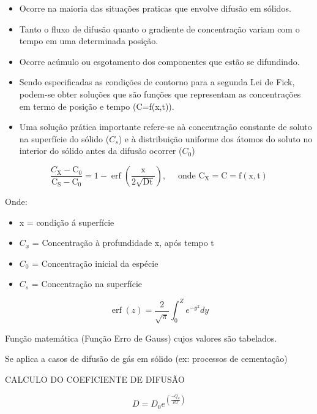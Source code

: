 \begin{itemize}
	\item Ocorre na maioria das situações praticas que envolve difusão em sólidos.
	\item Tanto o fluxo de difusão quanto o gradiente de concentração variam com o tempo em uma determinada posição.
	\item Ocorre acúmulo ou esgotamento dos componentes que estão se difundindo.
	\item Sendo especificadas as condições de contorno para a segunda Lei de Fick, podem-se obter soluções que são funções que representam as concentrações em termo de posição e tempo (C=f(x,t)).
	\item Uma solução prática importante refere-se aà concentração constante de soluto na superfície do sólido ($C_{s}$) e à distribuição uniforme dos átomos do soluto no interior do sólido antes da difusão  ocorrer ($C_{0}$)
\end{itemize}



\begin{equation}\label{key}
\frac{C_{\mathrm{X}}-\mathrm{C}_{0}}{\mathrm{C}_{\mathrm{S}}-\mathrm{C}_{0}}=1-\operatorname{erf}\left(\frac{\mathrm{x}}{2 \sqrt{\mathrm{D} \mathrm{t}}}\right), \quad \text { onde } \mathrm{C}_{\mathrm{X}}=\mathrm{C}=\mathrm{f}(\mathrm{x}, \mathrm{t})
\end{equation}


Onde:

\begin{itemize}
	\item x = condição á superfície
	\item $C_{x}$ = Concentração à profundidade x, após tempo t
	\item $C_{0}$ = Concentração inicial da espécie
	\item $C_{s}$ = Concentração na superfície
\end{itemize}


\begin{equation}\label{key}
\operatorname{erf}(z)=\frac{2}{\sqrt{\pi}} \int_{0}^{Z} e^{-y^{2}} d y
\end{equation}

Função matemática (Função Erro de Gauss) cujos valores são tabelados. 

Se aplica a casos de difusão de gás em sólido (ex: processos de cementação)

CALCULO DO COEFICIENTE DE DIFUSÃO

\begin{equation}\label{key}
D=D_{0} e^{\left( \frac{-Q_{d}}{R T}  \right)}
\end{equation}

